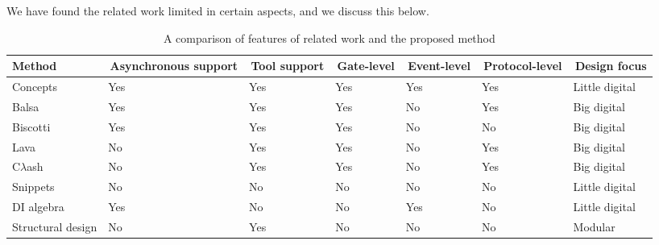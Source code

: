 \documentclass[british, journal]{IEEEtran}
\begin{document}
We have found the related work limited in certain aspects, and we discuss this below.

\begin{table}[t]
\caption{A comparison of features of related work and the proposed method \label{tab:related_work}}
  \centering
  \begin{tabular}[htb]{| m{2.6cm} | m{2.0cm} | m{1.3cm} | m{1.5cm} | m{1.5cm} | m{1.7cm} | m{1.9cm} |}
  \hline
  Method             & \,Asynchronous support & \,Tool support  & \,Gate-level & \,Event-level & \,Protocol-level  & \,Design focus \\ \hline \hline
  Concepts            & Yes                               & Yes                       & Yes                       & Yes                         & Yes                              & Little digital \\ \hline
  Balsa             & Yes                               & Yes                        & Yes                       & No                          & Yes                              & Big digital \\ \hline
  Biscotti            & Yes                               & Yes                         & Yes                       & No                          & No                               & Big digital \\ \hline
  Lava              & No                               & Yes                       & Yes                       & No                          & Yes                              & Big digital \\ \hline
  C$\lambda$ash     & No                               & Yes                        & Yes                       & No                          & Yes                              & Big digital \\ \hline
  Snippets          & No                                & No                        & No                        & No                          & No                               & Little digital \\ \hline
  DI algebra        & Yes                               & No                         & No                        & Yes                         & No                               & Little digital \\ \hline
  Structural design & No                                & Yes                        & No                        & No                          & No                               & Modular \\ \hline
  \end{tabular}
  \vspace{-3mm}
\end{table}
\end{document}
